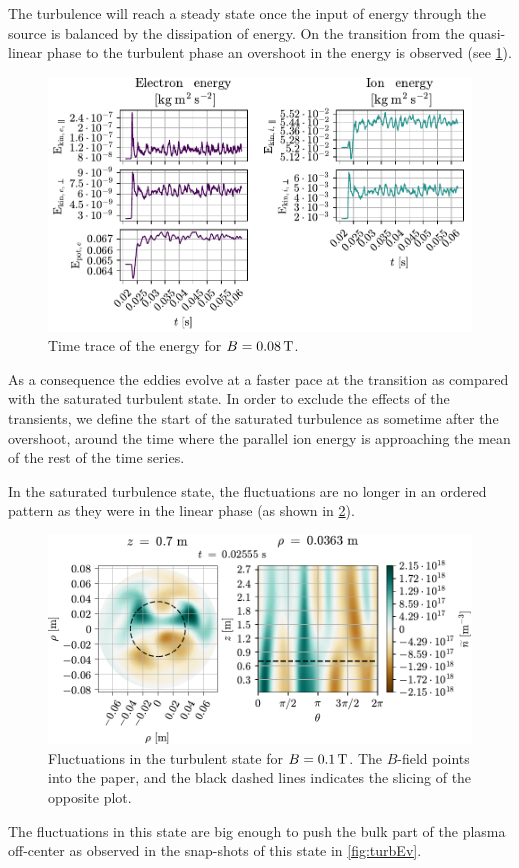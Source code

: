 The turbulence will reach a steady state once the input of energy through the source is balanced by the dissipation of energy.
On the transition from the quasi-linear phase to the turbulent phase an overshoot in the energy is observed (see \cref{fig:energyTrace008}).
%
\begin{figure}[htb]
    \centering
    \includegraphics{fig/results/energyTrace/energyTraceB008}
    \caption{Time trace of the energy for $B=0.08\, \text{T}$.}
    \label{fig:energyTrace008}
\end{figure}
%
As a consequence the eddies evolve at a faster pace at the transition as compared with the saturated turbulent state.
In order to exclude the effects of the transients, we define the start of the saturated turbulence as sometime after the overshoot, around the time where the parallel ion energy is approaching the mean of the rest of the time series.

In the saturated turbulence state, the fluctuations are no longer in an ordered pattern as they were in the linear phase (as shown in \cref{fig:2DFluct}).
%
\begin{figure}[htb]
    \centering
    \includegraphics{fig/results/2DTurbulence/fluct}
    \caption{Fluctuations in the turbulent state for $B=0.1\, \text{T}$.
        The $B$-field points into the paper, and the black dashed lines indicates the slicing of the opposite plot.
    }
    \label{fig:2DFluct}
\end{figure}
%
The fluctuations in this state are big enough to push the bulk part of the plasma off-center as observed in the snap-shots of this state in \cref{fig:turbEv}.

